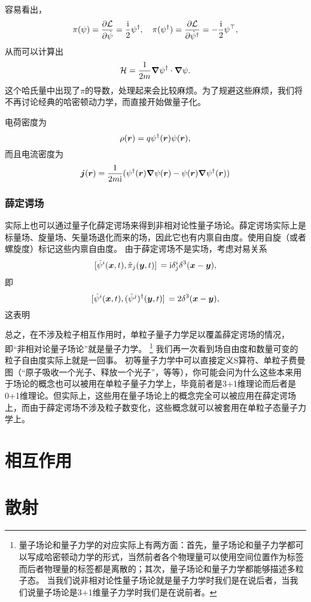 \documentclass[hyperref, UTF8, a4paper]{ctexart}
\newcommand*{\ii}{\mathrm{i}}
\begin{document}
容易看出，
\[
    \pi(\psi) = \pdv{\mathcal{L}}{\dot{\psi}} = \frac{\ii}{2} \psi^\dagger, \quad \pi(\psi^\dagger) = \pdv{\mathcal{L}}{\dot{\psi}^\dagger} = - \frac{\ii}{2} \psi^\top,
\]
从而可以计算出
\begin{equation}
    \mathcal{H} = \frac{1}{2m} \grad{\psi^\dagger} \cdot \grad{\psi}.
\end{equation}
这个哈氏量中出现了$\pi$的导数，处理起来会比较麻烦。为了规避这些麻烦，我们将不再讨论经典的哈密顿动力学，而直接开始做量子化。

电荷密度为
\begin{equation}
    \rho(\vb*{r}) = q \psi^\dagger(\vb*{r}) \psi(\vb*{r}),
\end{equation}
而且电流密度为
\begin{equation}
    \vb*{j}(\vb*{r}) = \frac{1}{2m\ii} (\psi^\dagger(\vb*{r}) \grad{\psi}(\vb*{r}) - \psi(\vb*{r}) \grad{\psi}^\dagger(\vb*{r}))
\end{equation}

\subsubsection{薛定谔场}

实际上也可以通过量子化薛定谔场来得到非相对论性量子场论。薛定谔场实际上是标量场、旋量场、矢量场退化而来的场，因此它也有内禀自由度。使用自旋（或者螺旋度）标记这些内禀自由度。
由于薛定谔场不是实场，考虑对易关系
\[
    \comm*{\hat{\psi}^i(\vb*{x}, t)}{\hat{\pi}_j(\vb*{y}, t)} = \ii \delta^i_j \delta^3 (\vb*{x} - \vb*{y}),
\]
即
\[
    \comm*{\hat{\psi}^i(\vb*{x}, t)}{(\hat{\psi}^j)^\dagger (\vb*{y}, t)} = 2 \delta^3 (\vb*{x} - \vb*{y}),
\]
这表明

总之，在不涉及粒子相互作用时，单粒子量子力学足以覆盖薛定谔场的情况，即“非相对论量子场论”就是量子力学。%
\footnote{
    量子场论和量子力学的对应实际上有两方面：首先，量子场论和量子力学都可以写成哈密顿动力学的形式，当然前者各个物理量可以使用空间位置作为标签而后者物理量的标签都是离散的；其次，量子场论和量子力学都能够描述多粒子态。
    当我们说非相对论性量子场论就是量子力学时我们是在说后者，当我们说量子场论是3+1维量子力学时我们是在说前者。
}%
我们再一次看到场自由度和数量可变的粒子自由度实际上就是一回事。
初等量子力学中可以直接定义S算符、单粒子费曼图（“原子吸收一个光子、释放一个光子”，等等），你可能会问为什么这些本来用于场论的概念也可以被用在单粒子量子力学上，毕竟前者是3+1维理论而后者是0+1维理论。但实际上，这些用在量子场论上的概念完全可以被应用在薛定谔场上，而由于薛定谔场不涉及粒子数变化，这些概念就可以被套用在单粒子态量子力学上。

\section{相互作用}

\section{散射}
\end{document}
